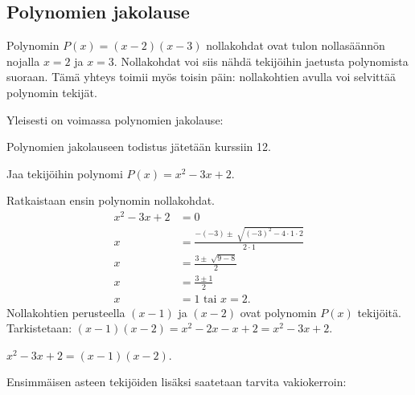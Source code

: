 \subsection{Polynomien jakolause}


Polynomin $P(x)=(x-2)(x-3)$ nollakohdat ovat tulon nollasäännön nojalla $x=2$ ja $x=3$. Nollakohdat voi siis nähdä tekijöihin jaetusta polynomista suoraan. Tämä  yhteys toimii myös toisin päin: nollakohtien avulla voi selvittää polynomin tekijät.

Yleisesti on voimassa polynomien jakolause:


Polynomien jakolauseen todistus jätetään kurssiin 12.

\begin{esimerkki}
Jaa tekijöihin polynomi $P(x)=x^2-3x+2$.
\begin{esimratk}
Ratkaistaan ensin polynomin nollakohdat.
\begin{align*}
x^2-3x+2&=0 \\
x&=\frac{-(-3) \pm \sqrt[]{(-3)^2-4 \cdot 1 \cdot 2}}{2 \cdot 1} \\
x&=\frac{3 \pm \sqrt[]{9-8}}{2} \\
x&=\frac{3 \pm 1}{2} \\
x&=1 \textrm{ tai } x = 2.
\end{align*}
Nollakohtien perusteella $(x-1)$ ja $(x-2)$ ovat polynomin $P(x)$ tekijöitä.
Tarkistetaan:
 $(x-1)(x-2)=x^2-2x-x+2= x^2-3x+2$.
\end{esimratk}
\begin{esimvast}
$x^2-3x+2 = (x-1)(x-2)$.
\end{esimvast}
\end{esimerkki}

Ensimmäisen asteen tekijöiden lisäksi saatetaan tarvita vakiokerroin:


